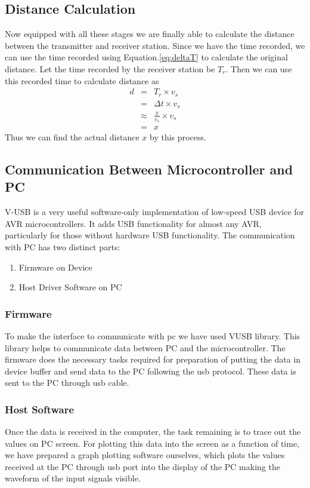 \subsection{Distance Calculation}
Now equipped with all these stages we are finally able to calculate the distance between the transmitter and receiver station. Since we have the time recorded, we can use the time recorded using Equation.\ref{eq:deltaT} to calculate the original distance. Let the time recorded by the receiver station be $T_r$. Then we can use this recorded time to calculate distance as
\begin{eqnarray*}
	d &=& T_r \times v_s\\
	{}&=&\Delta t \times v_s\\
	{}&\approx&\frac{x}{v_s} \times v_s\\
	{}& = & x
\end{eqnarray*}
Thus we can find the actual distance $x$ by this process.



\subsection{Communication Between Microcontroller and PC}
 V-USB is a very useful software-only implementation of low-speed USB device for AVR microcontrollers. It adds USB functionality for almost any AVR, particularly for those without hardware USB functionality. The communication with PC has two distinct parts:
\begin{enumerate}
	\item Firmware on Device
	\item Host Driver Software on PC
\end{enumerate}

\subsubsection{Firmware}
To make the interface to communicate with pc we have used VUSB library. This library helps to communicate data between PC and the microcontroller. The firmware does the necessary tasks required for preparation of putting the data in device buffer and send data to the PC following the \gls{usb} protocol. These data is sent to the PC through \gls{usb} cable.


\subsubsection{Host Software}
Once the data is received in the computer, the task remaining is to trace out the values on PC screen. For plotting this data into the screen as a function of time, we have prepared a graph plotting software ourselves, which plots the values received at the PC through \gls{usb} port into the display of the PC making the waveform of the input signals visible. 

